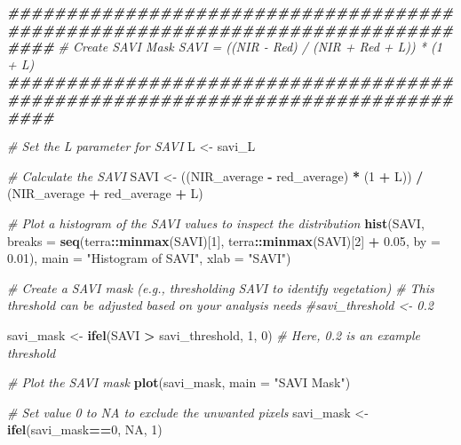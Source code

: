 \documentclass[
]{article}
\newenvironment{Shaded}{\begin{snugshade}}{\end{snugshade}}
\newcommand{\AttributeTok}[1]{\textcolor[rgb]{0.13,0.29,0.53}{#1}}
\newcommand{\CommentTok}[1]{\textcolor[rgb]{0.56,0.35,0.01}{\textit{#1}}}
\newcommand{\ConstantTok}[1]{\textcolor[rgb]{0.56,0.35,0.01}{#1}}
\newcommand{\DecValTok}[1]{\textcolor[rgb]{0.00,0.00,0.81}{#1}}
\newcommand{\DocumentationTok}[1]{\textcolor[rgb]{0.56,0.35,0.01}{\textbf{\textit{#1}}}}
\newcommand{\FloatTok}[1]{\textcolor[rgb]{0.00,0.00,0.81}{#1}}
\newcommand{\FunctionTok}[1]{\textcolor[rgb]{0.13,0.29,0.53}{\textbf{#1}}}
\newcommand{\NormalTok}[1]{#1}
\newcommand{\OtherTok}[1]{\textcolor[rgb]{0.56,0.35,0.01}{#1}}
\newcommand{\SpecialCharTok}[1]{\textcolor[rgb]{0.81,0.36,0.00}{\textbf{#1}}}
\newcommand{\StringTok}[1]{\textcolor[rgb]{0.31,0.60,0.02}{#1}}
\begin{document}
\begin{Shaded}
\begin{Highlighting}[]
\DocumentationTok{\#\#\#\#\#\#\#\#\#\#\#\#\#\#\#\#\#\#\#\#\#\#\#\#\#\#\#\#\#\#\#\#\#\#\#\#\#\#\#\#\#\#\#\#\#\#\#\#\#\#\#\#\#\#\#\#\#\#\#\#\#\#\#\#\#\#\#\#\#\#\#\#\#\#\#\#\#\#\#\#}
\CommentTok{\# Create SAVI Mask SAVI = ((NIR {-} Red) / (NIR + Red + L)) * (1 + L)}
\DocumentationTok{\#\#\#\#\#\#\#\#\#\#\#\#\#\#\#\#\#\#\#\#\#\#\#\#\#\#\#\#\#\#\#\#\#\#\#\#\#\#\#\#\#\#\#\#\#\#\#\#\#\#\#\#\#\#\#\#\#\#\#\#\#\#\#\#\#\#\#\#\#\#\#\#\#\#\#\#\#\#\#\#}

\CommentTok{\# Set the L parameter for SAVI}
\NormalTok{L }\OtherTok{\textless{}{-}}\NormalTok{ savi\_L}

\CommentTok{\# Calculate the SAVI}
\NormalTok{SAVI }\OtherTok{\textless{}{-}}\NormalTok{ ((NIR\_average }\SpecialCharTok{{-}}\NormalTok{ red\_average) }\SpecialCharTok{*}\NormalTok{ (}\DecValTok{1} \SpecialCharTok{+}\NormalTok{ L)) }\SpecialCharTok{/}\NormalTok{ (NIR\_average }\SpecialCharTok{+}\NormalTok{ red\_average }\SpecialCharTok{+}\NormalTok{ L)}

\CommentTok{\# Plot a histogram of the SAVI values to inspect the distribution}
\FunctionTok{hist}\NormalTok{(SAVI, }\AttributeTok{breaks =} \FunctionTok{seq}\NormalTok{(terra}\SpecialCharTok{::}\FunctionTok{minmax}\NormalTok{(SAVI)[}\DecValTok{1}\NormalTok{], terra}\SpecialCharTok{::}\FunctionTok{minmax}\NormalTok{(SAVI)[}\DecValTok{2}\NormalTok{] }\SpecialCharTok{+} \FloatTok{0.05}\NormalTok{, }\AttributeTok{by =} \FloatTok{0.01}\NormalTok{),}
     \AttributeTok{main =} \StringTok{"Histogram of SAVI"}\NormalTok{, }\AttributeTok{xlab =} \StringTok{"SAVI"}\NormalTok{)}

\CommentTok{\# Create a SAVI mask (e.g., thresholding SAVI to identify vegetation)}
\CommentTok{\# This threshold can be adjusted based on your analysis needs}
\CommentTok{\#savi\_threshold \textless{}{-} 0.2}

\NormalTok{savi\_mask }\OtherTok{\textless{}{-}} \FunctionTok{ifel}\NormalTok{(SAVI }\SpecialCharTok{\textgreater{}}\NormalTok{ savi\_threshold, }\DecValTok{1}\NormalTok{, }\DecValTok{0}\NormalTok{)  }\CommentTok{\# Here, 0.2 is an example threshold}

\CommentTok{\# Plot the SAVI mask}
\FunctionTok{plot}\NormalTok{(savi\_mask, }\AttributeTok{main =} \StringTok{"SAVI Mask"}\NormalTok{)}

\CommentTok{\# Set value 0 to NA to exclude the unwanted pixels}
\NormalTok{savi\_mask }\OtherTok{\textless{}{-}} \FunctionTok{ifel}\NormalTok{(savi\_mask}\SpecialCharTok{==}\DecValTok{0}\NormalTok{, }\ConstantTok{NA}\NormalTok{, }\DecValTok{1}\NormalTok{)}


\end{Highlighting}
\end{Shaded}
\end{document}
